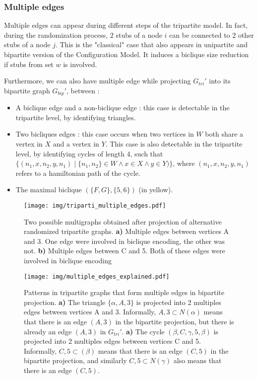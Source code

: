 \documentclass[table]{report}
\begin{document}
\subsubsection{Multiple edges}

Multiple edges can appear during different steps of the tripartite model. In fact, during the randomization process, 2 stubs of a node $i$ can be connected to 2 other stubs of a node $j$. This is the "classical" case that also appears in unipartite and bipartite version of the Configuration Model. It induces a biclique size reduction if stubs from set $w$ is involved. 

Furthermore, we can also have multiple edge while projecting ${G_{tri}}'$ into its bipartite graph ${G_{bip}}'$, between :

\begin{itemize}[noitemsep]
    \item A biclique edge and a non-biclique edge : this case is detectable in the tripartite level, by identifying triangles.
    \item Two bicliques edges : this case occurs when two vertices in $W$ both share a vertex in $X$ and a vertex in $Y$. This case is also detectable in the tripartite level, by identifying cycles of length 4, such that $\{(n_1,x,n_2,y,n_1) \mid \{n_1,n_2\} \in W \wedge x \in X \wedge y \in Y)\}$, where $(n_1,x,n_2,y,n_1)$ refers to a hamiltonian path of the cycle.
    \item The maximal biclique $(\{F,G\}, \{5,6\})$ (in yellow).
\end{itemize}  


\begin{figure}[h]%
\centering
\texttt{[image: img/triparti\_multiple\_edges.pdf]}
\caption{Two possible multigraphs obtained after projection of alternative randomized tripartite graphs. \textbf{a)} Multiple edges between vertices A and 3. One edge were involved in biclique encoding, the other was not. \textbf{b)} Multiple edges between C and 5. Both of these edges were involved in biclique encoding}
\label{fig:graphs}
\end{figure}
\FloatBarrier

\begin{figure}[h]%
\centering
\texttt{[image: img/multiple\_edges\_explained.pdf]}
\caption{Patterns in tripartite graphs that form multiple edges in bipartite projection. 
\textbf{a)} The triangle $\{\alpha,A,3\}$ is projected into 2 multiples edges between vertices A and 3. Informally, ${A,3} \subset N(\alpha)$ means that there is an edge $(A,3)$ in the bipartite projection, but there is already an edge $(A,3)$ in ${G_{tri}}'$.
\textbf{a)} The cycle $(\beta,C,\gamma,5,\beta)$ is projected into 2 multiples edges between vertices C and 5. Informally, ${C,5} \subset (\beta)$ means that there is an edge $(C,5)$ in the bipartite projection, and similarly ${C,5} \subset N(\gamma)$ also means that there is an edge $(C,5)$.
}
\label{fig:graphs}
\end{figure}
\FloatBarrier
\end{document}
